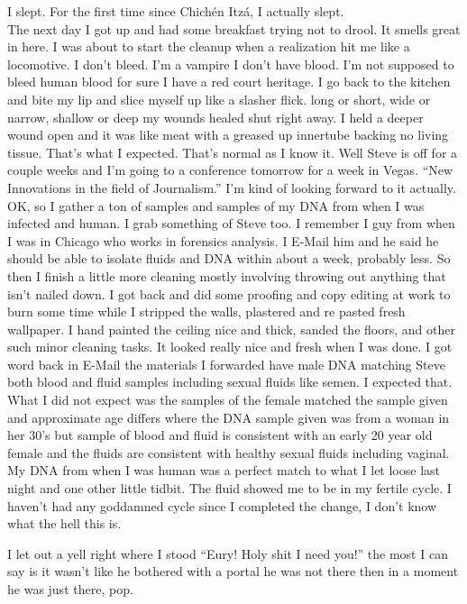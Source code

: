 I slept. For the first time since Chich\'{e}n Itz\'{a}, I actually slept.\\

The next day I got up and had some breakfast trying not to drool. It smells great in here. I was about to start the cleanup when a realization hit me like a locomotive. I don't bleed. I'm a vampire I don't have blood. I'm not supposed to bleed human blood for sure I have a red court heritage. I go back to the kitchen and bite my lip and slice myself up like a slasher flick. long or short, wide or narrow, shallow or deep my wounds healed shut right away. I held a deeper wound open and it was like meat with a greased up innertube backing no living tissue. That's what I expected. That's normal as I know it. Well Steve is off for a couple weeks and I'm going to a conference tomorrow for a week in Vegas. ``New Innovations in the field of Journalism.'' I'm kind of looking forward to it actually. OK, so I gather a ton of samples and samples of my DNA from when I was infected and human. I grab something of Steve too. I remember I guy from when I was in Chicago who works in forensics analysis. I E-Mail him and he said he should be able to isolate fluids and DNA within about a week, probably less. So then I finish a little more cleaning mostly involving throwing out anything that isn't nailed down. I got back and did some proofing and copy editing at work to burn some time while I stripped the walls, plastered and re pasted fresh wallpaper. I hand painted the ceiling nice and thick, sanded the floors, and other such minor cleaning tasks. It looked really nice and fresh when I was done. I got word back in E-Mail the materials I forwarded have male DNA matching Steve both blood and fluid samples including sexual fluids like semen. I expected that. What I did not expect was the samples of the female matched the sample given and approximate age differs where the DNA sample given was from a woman in her 30's but sample of blood and fluid is consistent with an early 20 year old female and the fluids are consistent with healthy sexual fluids including vaginal. My DNA from when I was human was a perfect match to what I let loose last night and one other little tidbit. The fluid showed me to be in my fertile cycle. I haven't had any goddamned cycle since I completed the change, I don't know what the hell this is.

I let out a yell right where I stood ``Eury! Holy shit I need you!'' the most I can say is it wasn't like he bothered with a portal he was not there then in a moment he was just there, pop.

